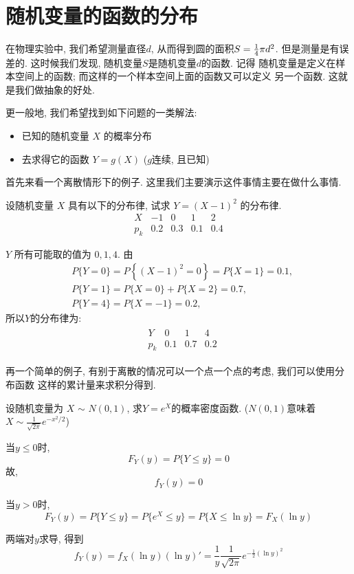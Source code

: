 \section{随机变量的函数的分布}

在物理实验中, 我们希望测量直径$d$, 从而得到圆的面积$S={1\over4} \pi d^2$. 
但是测量是有误差的. 这时候我们发现, 随机变量$S$是随机变量$d$的函数. 记得
随机变量是定义在样本空间上的函数; 而这样的一个样本空间上面的函数又可以定义
另一个函数. 这就是我们做抽象的好处. 

更一般地, 我们希望找到如下问题的一类解法: 
\begin{itemize}
    \item 已知的随机变量 $X$ 的概率分布
    \item 去求得它的函数 $Y=g(X)$ ($g$连续, 且已知)
\end{itemize}

首先来看一个离散情形下的例子. 这里我们主要演示这件事情主要在做什么事情. 

\begin{example}
  设随机变量 $X$ 具有以下的分布律, 试求 $Y=(X-1)^2$ 的分布律.
  $$
\begin{array}{c|cccc}
X & -1 & 0 & 1 & 2 \\
\hline p_k & 0.2 & 0.3 & 0.1 & 0.4
\end{array}
$$
\end{example}

\begin{solution}
  $Y$ 所有可能取的值为 $0,1,4$. 由
$$
\begin{aligned}
& P\{Y=0\}=P\left\{(X-1)^2=0\right\}=P\{X=1\}=0.1, \\
& P\{Y=1\}=P\{X=0\}+P\{X=2\}=0.7, \\
& P\{Y=4\}=P\{X=-1\}=0.2,
\end{aligned}
$$
所以$Y$的分布律为: 
$$
\begin{aligned}
&\begin{array}{c|ccc}
Y & 0 & 1 & 4 \\
\hline p_k & 0.1 & 0.7 & 0.2
\end{array}
\end{aligned}
$$
\end{solution}

再一个简单的例子, 有别于离散的情况可以一个点一个点的考虑, 我们可以使用分布函数
这样的累计量来求积分得到.  

\begin{example}
  设随机变量为 $X$ $\sim$ $N (0, 1)$, 求$Y = e^{X}$的概率密度函数. 
  ($N(0,1)$意味着$X\sim \frac1{\sqrt{2\pi}}e^{-x^2/2}$)
\end{example}
\begin{solution}
  当$y \leq 0$时,
  \[F_Y(y) = P\{Y \leq y\} = 0\]
  \quad 故,
  \[f_Y(y) = 0\]
  
  
  \quad 当$y > 0$时,
  \[F_Y(y) = P\{Y \leq y\} = P\{ e^{X} \leq y\} = P\{X \leq \ln{y}\}= F_X(\ln{y})\]
  
  \quad 两端对$y$求导, 得到
  \[f_Y(y) = f_X(\ln{y})(\ln{y})' = \frac{1}{y}\frac{1}{\sqrt{2\pi}}e^{-\frac{1}{2}(\ln y)^2}\]

\end{solution}

